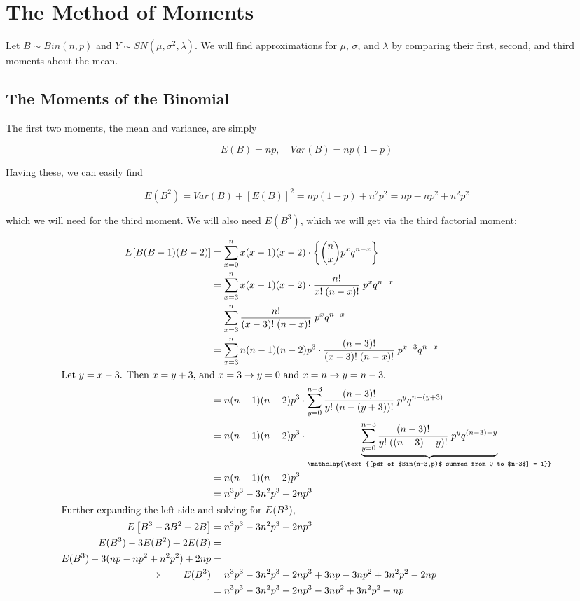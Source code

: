 \documentclass{article}
\begin{document}
\section{The Method of Moments}

Let $B \sim Bin(n, p)$ and $Y \sim SN(\mu, \sigma^2, \lambda)$. We will find
approximations for $\mu$, $\sigma$, and $\lambda$ by comparing their first,
second, and third moments about the mean.

\subsection{The Moments of the Binomial}

The first two moments, the mean and variance, are simply

\begin{equation*}
  E(B) = np, \quad Var(B) = np(1-p)
\end{equation*}

Having these, we can easily find

\begin{equation*}
  E(B^2) = Var(B) + [E(B)]^2 = np(1-p) + n^2p^2 = np - np^2 + n^2p^2
\end{equation*}

which we will need for the third moment. We will also need $E(B^3)$, which we
will get via the third factorial moment:

\begin{align*}
  E[B(B-1)(B-2)] &= \sum_{x=0}^n x (x-1) (x-2) \cdot \left\{ \binom{n}{x} p^x q^{n-x} \right\} \\
  &= \sum_{x=3}^n x(x-1)(x-2) \cdot \frac{n!}{x!\;(n-x)!} \; p^x q^{n-x} \\
  &= \sum_{x=3}^n \frac{n!}{(x-3)!\;(n-x)!} \; p^x q^{n-x} \\
  &= \sum_{x=3}^n n(n-1)(n-2) p^3 \cdot \frac{(n-3)!}{(x-3)!\;(n-x)!} \; p^{x-3}q^{n-x} \\
  \intertext{Let $y=x-3$. Then $x=y+3$, and $x=3 \rightarrow y=0$ and $x=n \rightarrow y=n-3$.}
  &= n(n-1)(n-2)p^3 \cdot \sum_{y=0}^{n-3} \frac{(n-3)!}{y!\;(n-(y+3))!} \; p^y q^{n-(y+3)} \\
  &= n(n-1)(n-2)p^3 \cdot \underbrace {\sum_{y=0}^{n-3} \frac{(n-3)!}{y!\;((n-3)-y)!} \; p^y q^{(n-3)-y}}_{\mathclap{\text{[pdf of $Bin(n-3,p)$ summed from 0 to $n-3$] = 1}}} \\
  &= n(n-1)(n-2)p^3 \\
  &= n^3p^3 - 3n^2p^3 + 2np^3 \\
  \intertext{Further expanding the left side and solving for $E(B^3)$,}
  E \left[ B^3 - 3B^2 + 2B \right] &= n^3p^3 - 3n^2p^3 + 2np^3 \\
  E(B^3) - 3E(B^2) + 2E(B) &= \\
  E(B^3) - 3(np - np^2 + n^2p^2) + 2np &= \\
  \Rightarrow \qquad E(B^3) &= n^3p^3 - 3n^2p^3 + 2np^3 + 3np - 3np^2 + 3n^2p^2 - 2np \\
  &= n^3p^3 - 3n^2p^3 + 2np^3 - 3np^2 + 3n^2p^2 + np
\end{align*}
\end{document}
